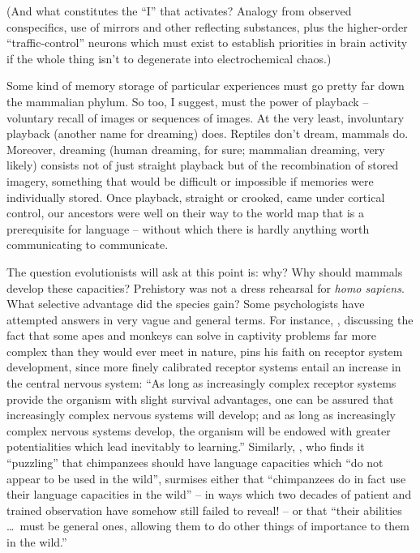 (And what constitutes the ``I'' that activates? Analogy from observed conspecifics, use of mirrors and other reflecting substances, plus the higher-order ``traffic-control'' neurons which must exist to establish priorities in brain activity if the whole thing isn't to degenerate into electrochemical chaos.)

Some kind of memory storage of particular experiences must go pretty far down the mammalian phylum. So too, I suggest, must
the power of playback -- voluntary recall of images or sequences of images. At the very least, involuntary playback (another name for dreaming) does. Reptiles don't dream, mammals do. Moreover, dreaming (human dreaming, for sure; mammalian dreaming, very likely) consists not of just straight playback but of the recombination of stored imagery, something that would be difficult or impossible if memories were individually stored. Once playback, straight or crooked, came under cortical control, our ancestors were well on their way to the world map that is a prerequisite for language -- without which there is hardly anything worth communicating to communicate.

The question evolutionists will ask at this point is: why? Why should mammals develop these capacities? Prehistory was not a dress rehearsal for \textit{homo sapiens}. What selective advantage did the species gain? Some psychologists have attempted answers in very vague and general terms. For instance, \citet{Harlow1958}, discussing the fact that some apes and monkeys can solve in captivity problems far more complex than they would ever meet in nature, pins his faith on receptor system development, since more finely calibrated receptor systems entail an increase in the central nervous system: ``As long as increasingly complex receptor systems provide the organism with slight survival advantages, one can be assured that increasingly complex nervous systems will develop; and as long as increasingly complex nervous systems develop, the organism will be endowed with greater potentialities which lead inevitably to learning.'' Similarly, \citet{Passingham1979}, who finds it ``puzzling'' that chimpanzees should have language capacities which ``do not appear to be used in the wild'', surmises either that ``chimpanzees do in fact use their language capacities in the wild'' -- in ways which two decades of patient and trained observation have somehow still failed to reveal! -- or that ``their abilities \ldots~must be general ones, allowing them to do other things of importance to them in the wild.''

